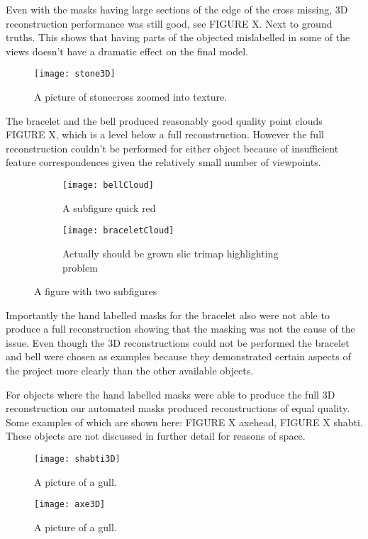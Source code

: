 \documentclass[12pt]{IIBproject}
\begin{document}
Even with the masks having large sections of the edge of the cross missing, 3D reconstruction performance was still good, see FIGURE X\cite{crossModel}. Next to ground truths. This shows that having parts of the objected mislabelled in some of the views doesn't have a dramatic effect on the final model.
\begin{figure}[H]
  \caption{A picture of stonecross zoomed into texture.}
  \centering
    \texttt{[image: stone3D]}
\end{figure}
The bracelet and the bell produced reasonably good quality point clouds FIGURE X, which is a level below a full reconstruction. However the full reconstruction couldn't be performed for either object because of insufficient feature correspondences given the relatively small number of viewpoints. 
\begin{figure}[H]
\centering
\begin{subfigure}{.45\textwidth}
  \centering
  \texttt{[image: bellCloud]}
  \caption{A subfigure quick red}
  \label{fig:sub2}
\end{subfigure}
\begin{subfigure}{.45\textwidth}
  \centering
  \texttt{[image: braceletCloud]}
  \caption{Actually should be grown slic trimap highlighting problem}
  \label{fig:sub2}
\end{subfigure}

\caption{A figure with two subfigures}
\label{fig:test}
\end{figure}

Importantly the hand labelled masks for the bracelet also were not able to produce a full reconstruction showing that the masking was not the cause of the issue. Even though the 3D reconstructions could not be performed the bracelet and bell were chosen as examples because they demonstrated certain aspects of the project more clearly than the other available objects. 

For objects where the hand labelled masks were able to produce the full 3D reconstruction our automated masks produced reconstructions of equal quality. Some examples of which are shown here: FIGURE X axehead, FIGURE X shabti. These objects are not discussed in further detail for reasons of space.
\begin{figure}[H]
  \caption{A picture of a gull.}
  \centering
    \texttt{[image: shabti3D]}
\end{figure}
\begin{figure}[H]
  \caption{A picture of a gull.}
  \centering
    \texttt{[image: axe3D]}
\end{figure}
\end{document}
